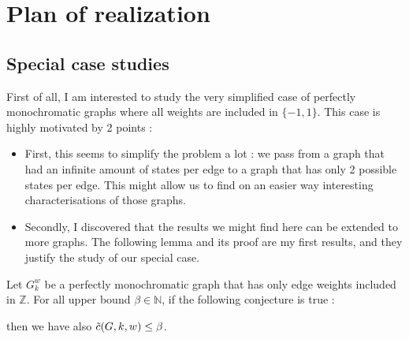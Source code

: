 \chapter{Plan of realization}

\section{Special case studies}

First of all, I am interested to study the very simplified case of perfectly monochromatic graphs where all weights are included in $\{-1, 1\}$. This case is highly motivated by 2 points :

\begin{itemize}
    \item First, this seems to simplify the problem a lot : we pass from a graph that had an infinite amount of states per edge to a graph that has only 2 possible states per edge. This might allow us to find on an easier way interesting characterisations of those graphs.

    \item Secondly, I discovered that the results we might find here can be extended to more graphs. The following lemma and its proof are my first results, and they justify the study of our special case.
\end{itemize}

\begin{lemma}
    Let $G_k^w$ be a perfectly monochromatic graph that has only edge weights included in $\mathbb{Z}$. For all upper bound $\beta \in \mathbb{N}$, if the following conjecture is true :
    \begin{center}
    \end{center}
    then we have also $\Tilde{c}(G, k, w) \leq \beta$.
\end{lemma}

